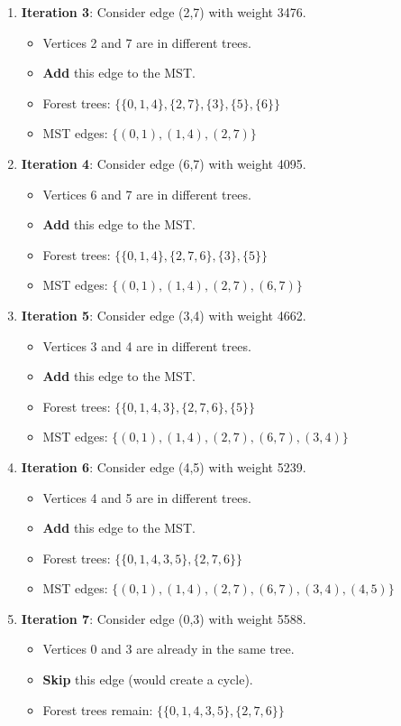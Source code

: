 \documentclass{article}
\theoremstyle{definition}
\begin{document}
\begin{enumerate}
\item \textbf{Iteration 3}: Consider edge (2,7) with weight 3476.
   \begin{itemize}
   \item Vertices 2 and 7 are in different trees.
   \item \textbf{Add} this edge to the MST.
   \item Forest trees: $\{\{0,1,4\}, \{2,7\}, \{3\}, \{5\}, \{6\}\}$
   \item MST edges: $\{(0,1), (1,4), (2,7)\}$
   \end{itemize}

\item \textbf{Iteration 4}: Consider edge (6,7) with weight 4095.
   \begin{itemize}
   \item Vertices 6 and 7 are in different trees.
   \item \textbf{Add} this edge to the MST.
   \item Forest trees: $\{\{0,1,4\}, \{2,7,6\}, \{3\}, \{5\}\}$
   \item MST edges: $\{(0,1), (1,4), (2,7), (6,7)\}$
   \end{itemize}

\item \textbf{Iteration 5}: Consider edge (3,4) with weight 4662.
   \begin{itemize}
   \item Vertices 3 and 4 are in different trees.
   \item \textbf{Add} this edge to the MST.
   \item Forest trees: $\{\{0,1,4,3\}, \{2,7,6\}, \{5\}\}$
   \item MST edges: $\{(0,1), (1,4), (2,7), (6,7), (3,4)\}$
   \end{itemize}

\item \textbf{Iteration 6}: Consider edge (4,5) with weight 5239.
   \begin{itemize}
   \item Vertices 4 and 5 are in different trees.
   \item \textbf{Add} this edge to the MST.
   \item Forest trees: $\{\{0,1,4,3,5\}, \{2,7,6\}\}$
   \item MST edges: $\{(0,1), (1,4), (2,7), (6,7), (3,4), (4,5)\}$
   \end{itemize}

\item \textbf{Iteration 7}: Consider edge (0,3) with weight 5588.
   \begin{itemize}
   \item Vertices 0 and 3 are already in the same tree.
   \item \textbf{Skip} this edge (would create a cycle).
   \item Forest trees remain: $\{\{0,1,4,3,5\}, \{2,7,6\}\}$
   \end{itemize}


\end{enumerate}
\end{document}
